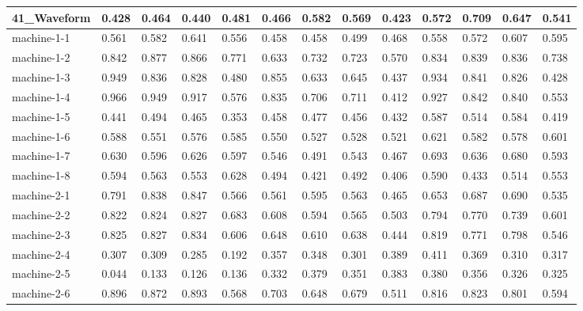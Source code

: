 \begin{table}[]
{\begin{tabular}{|l||l|l|l|l||l|l|l|l||l|l|l|l|}
			41\_Waveform    & 0.428  & 0.464 & 0.440 & 0.481  & 0.466 & 0.582 & 0.569 & 0.423 & 0.572 & 0.709        & 0.647  & 0.541 \\ 
			\hline
			machine-1-1     & 0.561  & 0.582 & 0.641 & 0.556  & 0.458 & 0.458 & 0.499 & 0.468 & 0.558 & 0.572        & 0.607  & 0.595 \\ 
			\hline
			machine-1-2     & 0.842  & 0.877 & 0.866 & 0.771  & 0.633 & 0.732 & 0.723 & 0.570 & 0.834 & 0.839        & 0.836  & 0.738 \\ 
			\hline
			machine-1-3     & 0.949  & 0.836 & 0.828 & 0.480  & 0.855 & 0.633 & 0.645 & 0.437 & 0.934 & 0.841        & 0.826  & 0.428 \\ 
			\hline
			machine-1-4     & 0.966  & 0.949 & 0.917 & 0.576  & 0.835 & 0.706 & 0.711 & 0.412 & 0.927 & 0.842        & 0.840  & 0.553 \\ 
			\hline
			machine-1-5     & 0.441  & 0.494 & 0.465 & 0.353  & 0.458 & 0.477 & 0.456 & 0.432 & 0.587 & 0.514        & 0.584  & 0.419 \\ 
			\hline
			machine-1-6     & 0.588  & 0.551 & 0.576 & 0.585  & 0.550 & 0.527 & 0.528 & 0.521 & 0.621 & 0.582        & 0.578  & 0.601 \\ 
			\hline
			machine-1-7     & 0.630  & 0.596 & 0.626 & 0.597  & 0.546 & 0.491 & 0.543 & 0.467 & 0.693 & 0.636        & 0.680  & 0.593 \\ 
			\hline
			machine-1-8     & 0.594  & 0.563 & 0.553 & 0.628  & 0.494 & 0.421 & 0.492 & 0.406 & 0.590 & 0.433        & 0.514  & 0.553 \\ 
			\hline
			machine-2-1     & 0.791  & 0.838 & 0.847 & 0.566  & 0.561 & 0.595 & 0.563 & 0.465 & 0.653 & 0.687        & 0.690  & 0.535 \\ 
			\hline
			machine-2-2     & 0.822  & 0.824 & 0.827 & 0.683  & 0.608 & 0.594 & 0.565 & 0.503 & 0.794 & 0.770        & 0.739  & 0.601 \\ 
			\hline
			machine-2-3     & 0.825  & 0.827 & 0.834 & 0.606  & 0.648 & 0.610 & 0.638 & 0.444 & 0.819 & 0.771        & 0.798  & 0.546 \\ 
			\hline
			machine-2-4     & 0.307  & 0.309 & 0.285 & 0.192  & 0.357 & 0.348 & 0.301 & 0.389 & 0.411 & 0.369        & 0.310  & 0.317 \\ 
			\hline
			machine-2-5     & 0.044  & 0.133 & 0.126 & 0.136  & 0.332 & 0.379 & 0.351 & 0.383 & 0.380 & 0.356        & 0.326  & 0.325 \\ 
			\hline
			machine-2-6     & 0.896  & 0.872 & 0.893 & 0.568  & 0.703 & 0.648 & 0.679 & 0.511 & 0.816 & 0.823        & 0.801  & 0.594 \\ 

\end{tabular}}
\end{table}
